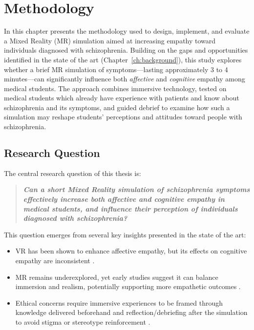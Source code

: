 \chapter{Methodology}
\label{ch:method}

In this chapter presents the methodology used to design, implement, and evaluate a Mixed Reality (MR) simulation aimed at increasing empathy toward individuals diagnosed with schizophrenia. Building on the gaps and opportunities identified in the state of the art (Chapter~\ref{ch:background}), this study explores whether a brief MR simulation of symptoms—lasting approximately 3 to 4 minutes—can significantly influence both \textit{affective} and \textit{cognitive} empathy among medical students. The approach combines immersive technology, tested on medical students which already have experience with patients and know about schizophrenia and its symptoms, and guided debrief to examine how such a simulation may reshape students' perceptions and attitudes toward people with schizophrenia.

\section{Research Question}

The central research question of this thesis is:

\begin{quote}
\textit{\textbf{Can a short Mixed Reality simulation of schizophrenia symptoms effectively increase both affective and cognitive empathy in medical students, and influence their perception of individuals diagnosed with schizophrenia?}}
\end{quote}

This question emerges from several key insights presented in the state of the art:

\begin{itemize}
    \item VR has been shown to enhance affective empathy, but its effects on cognitive empathy are inconsistent \cite{Martingano2021, Ventura2020}.
    \item MR remains underexplored, yet early studies suggest it can balance immersion and realism, potentially supporting more empathetic outcomes \cite{Silva2017, Krogmeier2024}.
    \item Ethical concerns require immersive experiences to be framed through knowledge delivered beforehand and reflection/debriefing after the simulation to avoid stigma or stereotype reinforcement \cite{Rueda2020, Ando2011}.
\end{itemize}


